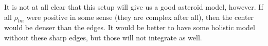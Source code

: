 \documentclass[aps,twocolumn,secnumarabic,balancelastpage,amsmath,amssymb,nofootinbib,floatfix]{revtex4-1}
\begin{document}
It is not at all clear that this setup will give us a good asteroid model, however. If all $\rho_{lm}$ were positive in some sense (they are complex after all), then the center would be denser than the edges. It would be better to have some holistic model without these sharp edges, but those will not integrate as well.




\end{document}
